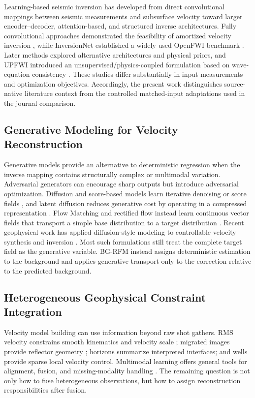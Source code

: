 \documentclass[remotesensing,article,submit,pdftex,moreauthors]{Definitions/mdpi}
\newcommand{\method}{BG-RFM}
\begin{document}
Learning-based seismic inversion has developed from direct convolutional mappings between seismic measurements and subsurface velocity toward larger encoder--decoder, attention-based, and structured inverse architectures. Fully convolutional approaches demonstrated the feasibility of amortized velocity inversion \citep{yang2019deeplearning}, while InversionNet established a widely used OpenFWI benchmark \citep{wu2020inversionnet,deng2022openfwi}. Later methods explored alternative architectures and physical priors, and UPFWI introduced an unsupervised/physics-coupled formulation based on wave-equation consistency \citep{jin2022upfwi}. These studies differ substantially in input measurements and optimization objectives. Accordingly, the present work distinguishes source-native literature context from the controlled matched-input adaptations used in the journal comparison.

\subsection{Generative Modeling for Velocity Reconstruction}

Generative models provide an alternative to deterministic regression when the inverse mapping contains structurally complex or multimodal variation. Adversarial generators can encourage sharp outputs but introduce adversarial optimization. Diffusion and score-based models learn iterative denoising or score fields \citep{ho2020ddpm,song2021scorebased}, and latent diffusion reduces generative cost by operating in a compressed representation \citep{rombach2022ldm}. Flow Matching and rectified flow instead learn continuous vector fields that transport a simple base distribution to a target distribution \citep{lipman2023flowmatching,liu2023rectifiedflow}. Recent geophysical work has applied diffusion-style modeling to controllable velocity synthesis and inversion \citep{wang2024controllable}. Most such formulations still treat the complete target field as the generative variable. \method{} instead assigns deterministic estimation to the background and applies generative transport only to the correction relative to the predicted background.

\subsection{Heterogeneous Geophysical Constraint Integration}

Velocity model building can use information beyond raw shot gathers. RMS velocity constrains smooth kinematics and velocity scale \citep{dix1955velocities}; migrated images provide reflector geometry \citep{stolt1978migration}; horizons summarize interpreted interfaces; and wells provide sparse local velocity control. Multimodal learning offers general tools for alignment, fusion, and missing-modality handling \citep{baltrusaitis2019multimodal,tian2020cmc,saporta2024symile}. The remaining question is not only how to fuse heterogeneous observations, but how to assign reconstruction responsibilities after fusion.
\end{document}
